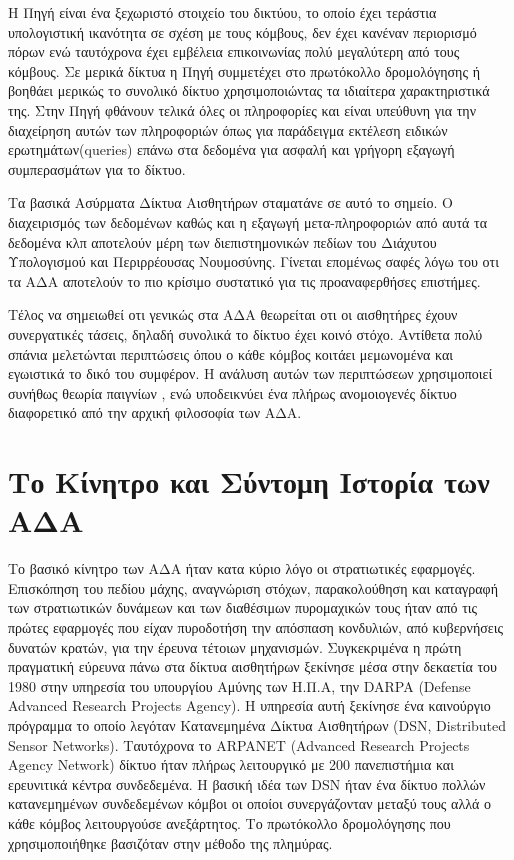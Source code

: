 Η Πηγή είναι ένα ξεχωριστό στοιχείο του δικτύου, το οποίο έχει τεράστια υπολογιστική ικανότητα σε σχέση με τους κόμβους, δεν έχει κανέναν περιορισμό πόρων ενώ
ταυτόχρονα έχει εμβέλεια επικοινωνίας
πολύ μεγαλύτερη από τους κόμβους.
Σε μερικά δίκτυα η Πηγή συμμετέχει στο πρωτόκολλο δρομολόγησης ή βοηθάει μερικώς το συνολικό δίκτυο χρησιμοποιώντας τα ιδιαίτερα χαρακτηριστικά της.
Στην Πηγή φθάνουν τελικά όλες οι πληροφορίες και είναι υπεύθυνη για την διαχείρηση αυτών των πληροφοριών όπως για παράδειγμα εκτέλεση ειδικών
ερωτημάτων(queries) επάνω στα δεδομένα για ασφαλή και γρήγορη εξαγωγή συμπερασμάτων για το δίκτυο.

Τα βασικά Ασύρματα Δίκτυα Αισθητήρων σταματάνε σε αυτό το σημείο.
Ο διαχειρισμός των δεδομένων καθώς και η εξαγωγή μετα-πληροφοριών από αυτά τα δεδομένα κλπ αποτελούν μέρη των διεπιστημονικών πεδίων του Διάχυτου Υπολογισμού και
Περιρρέουσας Νουμοσύνης.
Γίνεται επομένως σαφές λόγω του οτι τα ΑΔΑ αποτελούν το πιο κρίσιμο συστατικό για τις προαναφερθήσες επιστήμες.

Τέλος να σημειωθεί οτι γενικώς στα ΑΔΑ θεωρείται οτι οι αισθητήρες έχουν συνεργατικές τάσεις, δηλαδή συνολικά το δίκτυο έχει κοινό στόχο.
Αντίθετα πολύ σπάνια μελετώνται περιπτώσεις όπου ο κάθε κόμβος κοιτάει μεμωνομένα και εγωιστικά το δικό του συμφέρον.
Η ανάλυση αυτών των περιπτώσεων χρησιμοποιεί συνήθως θεωρία παιγνίων \cite{game_theroy_sensor}, ενώ υποδεικνύει ένα πλήρως ανομοιογενές δίκτυο διαφορετικό από την
αρχική φιλοσοφία των ΑΔΑ.

\section{Το Κίνητρο και Σύντομη Ιστορία των ΑΔΑ}
Το βασικό κίνητρο των ΑΔΑ ήταν κατα κύριο λόγο οι στρατιωτικές εφαρμογές.
Επισκόπηση του πεδίου μάχης, αναγνώριση στόχων, παρακολούθηση και καταγραφή των στρατιωτικών δυνάμεων και των διαθέσιμων πυρομαχικών τους ήταν από τις πρώτες
εφαρμογές που είχαν πυροδοτήση την απόσπαση κονδυλιών, από κυβερνήσεις δυνατών κρατών, για την έρευνα τέτοιων μηχανισμών.
Συγκεκριμένα η πρώτη πραγματική εύρευνα πάνω στα δίκτυα αισθητήρων ξεκίνησε μέσα στην δεκαετία του 1980 στην υπηρεσία του υπουργίου Αμύνης των Η.Π.Α, την DARPA
(Defense Advanced Research Projects Agency).
Η υπηρεσία αυτή ξεκίνησε ένα καινούργιο πρόγραμμα το οποίο λεγόταν Κατανεμημένα Δίκτυα Αισθητήρων (DSN, Distributed Sensor Networks).
Ταυτόχρονα το ARPANET (Advanced Research Projects Agency Network) δίκτυο ήταν πλήρως λειτουργικό με 200 πανεπιστήμια και ερευνιτικά κέντρα συνδεδεμένα.
Η βασική ιδέα των DSN ήταν ένα δίκτυο πολλών κατανεμημένων συνδεδεμένων κόμβοι οι οποίοι συνεργάζονταν μεταξύ τους αλλά ο κάθε κόμβος λειτουργούσε ανεξάρτητος.
Το πρωτόκολλο δρομολόγησης που χρησιμοποιήθηκε βασιζόταν στην μέθοδο της πλημύρας.

